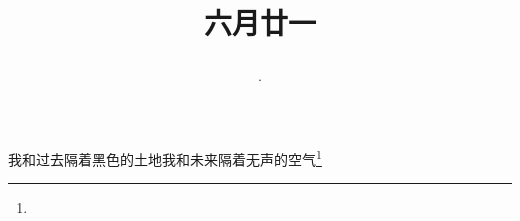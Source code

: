 \title{\date[d=26,m=7,y=2024][year:cn-y,年,month:cn,day:cn,日,·,weekday]·六月廿一 }
我和过去隔着黑色的土地我和未来隔着无声的空气\footnote{ }

